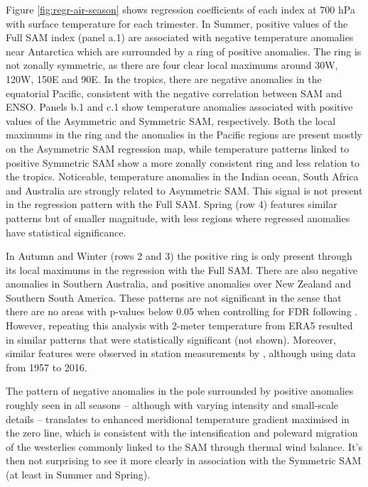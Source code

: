 \documentclass[]{ametsocV5}
\begin{document}
Figure \ref{fig:regr-air-season} shows regression coefficients of each index at 700 hPa with surface temperature for each trimester. In Summer, positive values of the Full SAM index (panel a.1) are associated with negative temperature anomalies near Antarctica which are surrounded by a ring of positive anomalies. The ring is not zonally symmetric, as there are four clear local maximums around 30\degree W, 120\degree W, 150\degree E and 90\degree E. In the tropics, there are negative anomalies in the equatorial Pacific, consistent with the negative correlation between SAM and ENSO. Panels b.1 and c.1 show temperature anomalies associated with positive values of the Asymmetric and Symmetric SAM, respectively. Both the local maximums in the ring and the anomalies in the Pacific regions are present mostly on the Asymmetric SAM regression map, while temperature patterns linked to positive Symmetric SAM show a more zonally consistent ring and less relation to the tropics. Noticeable, temperature anomalies in the Indian ocean, South Africa and Australia are strongly related to Asymmetric SAM. This signal is not present in the regression pattern with the Full SAM. Spring (row 4) features similar patterns but of smaller magnitude, with less regions where regressed anomalies have statistical significance.

In Autumn and Winter (rows 2 and 3) the positive ring is only present through its local maximums in the regression with the Full SAM. There are also negative anomalies in Southern Australia, and positive anomalies over New Zealand and Southern South America. These patterns are not significant in the sense that there are no areas with p-values below 0.05 when controlling for FDR following \citet{wilks2016}. However, repeating this analysis with 2-meter temperature from ERA5 resulted in similar patterns that were statistically significant (not shown). Moreover, similar features were observed in station measurements by \citet{jones2019}, although using data from 1957 to 2016.

The pattern of negative anomalies in the pole surrounded by positive anomalies roughly seen in all seasons -- although with varying intensity and small-scale details -- translates to enhanced meridional temperature gradient maximised in the zero line, which is consistent with the intensification and poleward migration of the westerlies commonly linked to the SAM through thermal wind balance. It's then not surprising to see it more clearly in association with the Symmetric SAM (at least in Summer and Spring).
\end{document}
